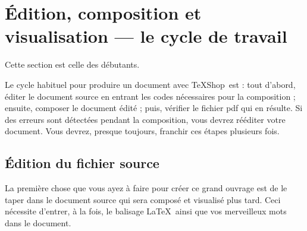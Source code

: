 \documentclass[11pt,french]{article}
\newcommand{\TS}{\textsf{\TeX Shop}}
\newcommand{\cmd}[1]{\textsf{#1}}
\begin{document}
\section{Édition, composition et visualisation --- le cycle de travail}

%

Cette section est celle des débutants.

Le cycle habituel pour produire un document avec \TS\ est : tout d'abord, éditer le document source en entrant les codes nécessaires pour la composition ; ensuite, composer le document édité ; puis, vérifier le fichier \cmd{pdf} qui en résulte. Si des erreurs sont détectées pendant la composition, vous devrez rééditer votre document. Vous devrez, presque toujours, franchir ces étapes plusieurs fois.

\subsection{Édition du fichier source}

La première chose que vous ayez à faire pour créer ce grand ouvrage est de le taper dans le document source qui sera composé et visualisé plus tard. Ceci nécessite d'entrer, à la fois, le balisage \LaTeX\ ainsi que vos merveilleux mots dans le document.

\end{document}
